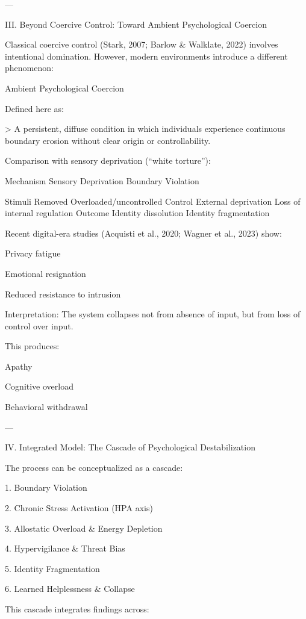 ---

III. Beyond Coercive Control: Toward Ambient Psychological Coercion

Classical coercive control (Stark, 2007; Barlow & Walklate, 2022) involves intentional domination. However, modern environments introduce a different phenomenon:

Ambient Psychological Coercion

Defined here as:

> A persistent, diffuse condition in which individuals experience continuous boundary erosion without clear origin or controllability.



Comparison with sensory deprivation (“white torture”):

Mechanism Sensory Deprivation Boundary Violation

Stimuli Removed Overloaded/uncontrolled
Control External deprivation Loss of internal regulation
Outcome Identity dissolution Identity fragmentation


Recent digital-era studies (Acquisti et al., 2020; Wagner et al., 2023) show:

Privacy fatigue

Emotional resignation

Reduced resistance to intrusion


Interpretation:
The system collapses not from absence of input, but from loss of control over input.

This produces:

Apathy

Cognitive overload

Behavioral withdrawal



---

IV. Integrated Model: The Cascade of Psychological Destabilization

The process can be conceptualized as a cascade:

1. Boundary Violation


2. Chronic Stress Activation (HPA axis)


3. Allostatic Overload & Energy Depletion


4. Hypervigilance & Threat Bias


5. Identity Fragmentation


6. Learned Helplessness & Collapse



This cascade integrates findings across:

